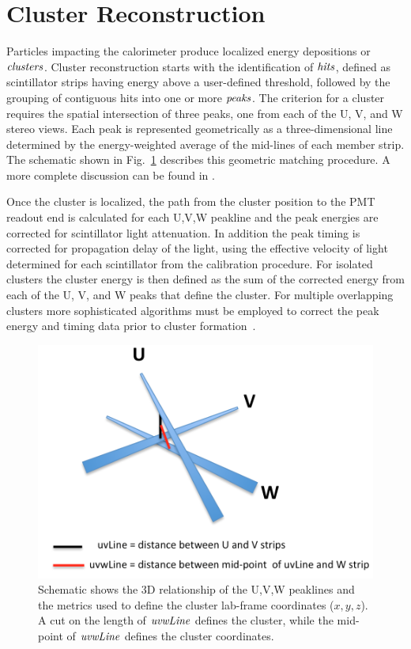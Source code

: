 \section{Cluster Reconstruction}

Particles impacting the calorimeter produce localized energy depositions or ${\it clusters}$.  Cluster reconstruction starts with the identification of ${\it hits}$, defined as scintillator strips having energy above a user-defined threshold, followed by the grouping of contiguous hits into one or more ${\it peaks}$.  The criterion for a cluster requires the spatial intersection of three peaks, one from each of the U, V, and W stereo views.  Each peak is represented geometrically as a three-dimensional line determined by the energy-weighted average of the mid-lines of each member strip.  The schematic shown in Fig.~\ref{fig:S6_0} describes this geometric matching procedure.  A more complete discussion can be found in \cite{nim:recon}.

Once the cluster is localized, the path from the cluster position to the PMT readout end is calculated for each
U,V,W peakline and the peak energies are corrected for scintillator light attenuation.  In addition the peak timing is corrected for propagation delay of the light, using the effective velocity of light determined for each scintillator from the calibration procedure.  For isolated clusters the cluster energy is then defined as the sum of the corrected energy from each of the U, V, and W peaks that define the cluster. For multiple overlapping clusters more sophisticated algorithms must be employed to correct the peak energy and timing data prior to cluster formation~\cite{nim:recon}.

\begin{figure}[hbt]
\centering
\includegraphics[width=0.95\columnwidth,keepaspectratio]{img/S6_0.png}
\caption{Schematic shows the 3D relationship of the U,V,W peaklines and the metrics used to define the cluster
  lab-frame coordinates ($x,y,z$). A cut on the length of ${\it uvwLine}$ defines the cluster, while the mid-point of ${\it uvwLine}$ defines the cluster coordinates.}
\label{fig:S6_0}
\end{figure}


